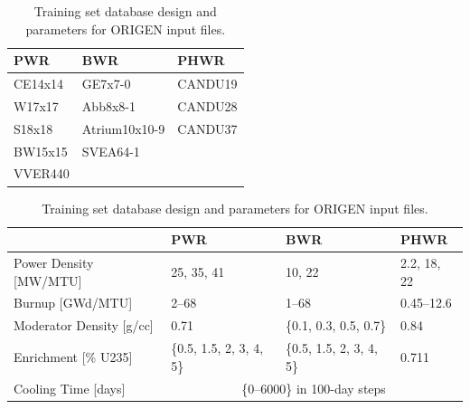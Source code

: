 \begin{table}[!htb]
  \centering
  \begin{subtable}{\linewidth}
    \centering
    \begin{tabular}{@{}lll@{}}
    \toprule
      \textbf{PWR} & \textbf{BWR}  & \textbf{PHWR} \\ \toprule
      CE14x14      & GE7x7-0       & CANDU19       \\
      W17x17       & Abb8x8-1      & CANDU28       \\
      S18x18       & Atrium10x10-9 & CANDU37       \\
      BW15x15      & SVEA64-1      &               \\
      VVER440      &               &               \\ \bottomrule
    \end{tabular}
    \caption{\gls{ORIGEN} designations for reactor technologies and fuel assembly design.}
    \label{tbl:rxtrtype}
    \vspace*{5mm}
  \end{subtable}
  \begin{subtable}{\linewidth}
    \centering
    \begin{tabular}{@{}llll@{}}
      \toprule
                              & \textbf{PWR}                     & \textbf{BWR}                     & \textbf{PHWR} \\ \toprule
      Power Density [MW/MTU]  & 25, 35, 41                       & 10, 22                           & 2.2, 18, 22   \\
      Burnup [GWd/MTU]        & 2--68                            & 1--68                            & 0.45--12.6    \\
      Moderator Density [g/cc]& 0.71                             & \{0.1, 0.3, 0.5, 0.7\}           & 0.84          \\
      Enrichment [\% U235]    & \{0.5, 1.5, 2, 3, 4, 5\}         & \{0.5, 1.5, 2, 3, 4, 5\}         & 0.711         \\
      Cooling Time [days]     & \multicolumn{3}{c}{\{0--6000\} in 100-day steps}                                    \\ \bottomrule
    \end{tabular}
    \caption{Simulation parameters for \gls{ORIGEN} input files.}
    \label{tbl:rxtrparam}
  \end{subtable}%
  \caption{Training set database design and parameters for \gls{ORIGEN} input files.}
  \label{tbl:train}
\end{table}

